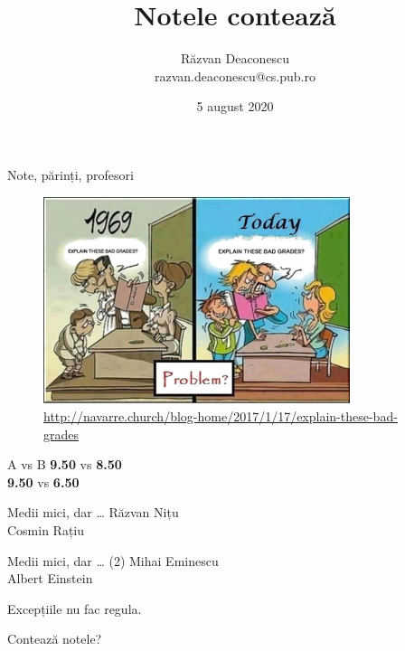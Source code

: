 \documentclass{simple}
\title[Notele contează]{Notele contează}
\institute{Code Sinaia 2020 (online)}
\author[Răzvan Deaconescu]{Răzvan Deaconescu \\
razvan.deaconescu@cs.pub.ro}
\date{5 august 2020}
\begin{document}
\frame{\titlepage}

\begin{frame}{Note, părinți, profesori}
  \begin{figure}[!htbp]
    \centering
    \includegraphics[width=0.8\textwidth]{img/bad-grades.jpg} \\
    \tiny{\url{http://navarre.church/blog-home/2017/1/17/explain-these-bad-grades}}
  \end{figure}
\end{frame}

\begin{frame}{A vs B}
  \centering
  \pause
  \Large
  \textbf{9.50} vs \textbf{8.50} \\
  \pause
  \vspace{3mm}
  \textbf{9.50} vs \textbf{6.50}
\end{frame}

\begin{frame}{Medii mici, dar \ldots}
  \centering
  \pause
  \Large
  Răzvan Nițu \\
  \pause
  \vspace{3mm}
  Cosmin Rațiu
\end{frame}

\begin{frame}{Medii mici, dar \ldots{} (2)}
  \centering
  \pause
  \Large
  Mihai Eminescu \\
  \pause
  \vspace{3mm}
  Albert Einstein
\end{frame}

\begin{frame}{}
  \centering
  \Large
  Excepțiile nu fac regula.
\end{frame}

\begin{frame}{}
  \centering
  \Large
  Contează notele?
\end{frame}
\end{document}
